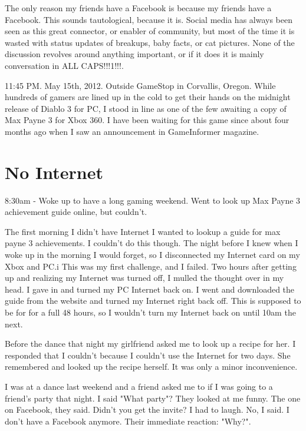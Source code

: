 \documentclass[12pt,letterpaper]{article}
\begin{document}
The only reason my friends have a Facebook is because my friends have a
Facebook. This sounds tautological, because it is. Social media has
always been seen as this great connector, or enabler of community, but
most of the time it is wasted  with status updates of breakups, baby
facts, or cat pictures. None of the discussion revolves around anything
important, or if it does it is mainly conversation in ALL
CAPS!!!1!!!.

11:45 PM. May 15th, 2012. Outside GameStop in Corvallis, Oregon. While hundreds of gamers are lined up
in the cold to get their hands on the midnight release of Diablo 3 for
PC, I stood in line as one of the few awaiting a copy of Max Payne 3 for
Xbox 360. I have been waiting for this game since about four months ago
when I saw an announcement in GameInformer magazine. 


\section{No Internet}
8:30am - Woke up to have a long gaming weekend. Went to look up Max
Payne 3 achievement guide online, but couldn't.

The first morning I didn't have Internet I wanted to lookup a guide for
max payne 3 achievements. I couldn't do this though. The night before I
knew when I woke up in the morning I would forget, so I disconnected my
Internet card on my Xbox and PC.i This was my first challenge, and I
failed. Two hours after getting up and realizing my Internet was turned
off, I mulled the thought over in my head.  I gave in and turned my PC
Internet back on. I went and downloaded the guide from the website and
turned my Internet right back off. This is supposed to be for for a full
48 hours, so I wouldn't turn my Internet back on until 10am the next.


Before the dance that night my girlfriend asked me to look up a recipe
for her. I responded that I couldn't because I couldn't use the Internet
for two days. She remembered and looked up the recipe herself. It was
only a minor inconvenience.


I was at a dance last weekend and a friend asked me to if I was
going to a friend's party that night. I said "What party"? They looked
at me funny. The one on Facebook, they said. Didn't you get the invite?
I had to laugh. No, I said. I don't have a Facebook anymore. Their
immediate reaction: "Why?".
\end{document}
